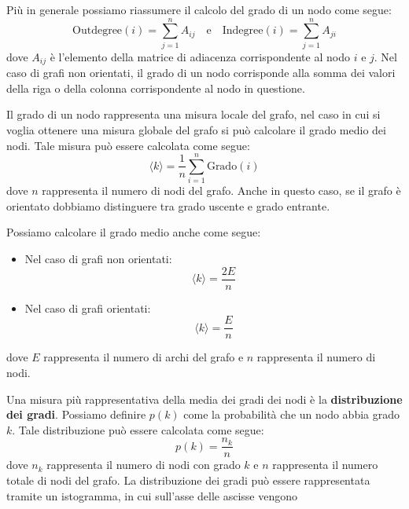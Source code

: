 Più in generale possiamo riassumere il calcolo del grado di un nodo come segue:
\begin{equation}
    \text{Outdegree}(i) = \sum_{j=1}^{n} A_{ij} \quad \text{e} \quad
    \text{Indegree}(i) = \sum_{j=1}^{n} A_{ji}
\end{equation}
dove $A_{ij}$ è l'elemento della matrice di adiacenza corrispondente al nodo
$i$ e $j$. Nel caso di grafi non orientati, il grado di un nodo corrisponde
alla somma dei valori della riga o della colonna corrispondente al nodo in
questione.

Il grado di un nodo rappresenta una misura locale del grafo, nel caso in cui
si voglia ottenere una misura globale del grafo si può calcolare il grado
medio dei nodi. Tale misura può essere calcolata come segue:
\begin{equation}
    \langle k \rangle = \frac{1}{n} \sum_{i=1}^{n} \text{Grado}(i)
\end{equation}
dove $n$ rappresenta il numero di nodi del grafo. Anche in questo caso, se il
grafo è orientato dobbiamo distinguere tra grado uscente e grado entrante.
\begin{nota}
    Possiamo calcolare il grado medio anche come segue:
    \begin{itemize}
        \item Nel caso di grafi non orientati:
              \begin{equation}
                  \langle k \rangle = \frac{2E}{n}
              \end{equation}
        \item Nel caso di grafi orientati:
              \begin{equation}
                  \langle k \rangle = \frac{E}{n}
              \end{equation}
    \end{itemize}
    dove $E$ rappresenta il numero di archi del grafo e $n$ rappresenta il
    numero di nodi.
\end{nota}
Una misura più rappresentativa della media dei gradi dei nodi è la \textbf{distribuzione
    dei gradi}. Possiamo definire $p(k)$ come la probabilità che un nodo abbia
grado $k$. Tale distribuzione può essere calcolata come segue:
\begin{equation}
    p(k) = \frac{n_k}{n}
\end{equation}
dove $n_k$ rappresenta il numero di nodi con grado $k$ e $n$ rappresenta il
numero totale di nodi del grafo. La distribuzione dei gradi può essere
rappresentata tramite un istogramma, in cui sull'asse delle ascisse vengono
